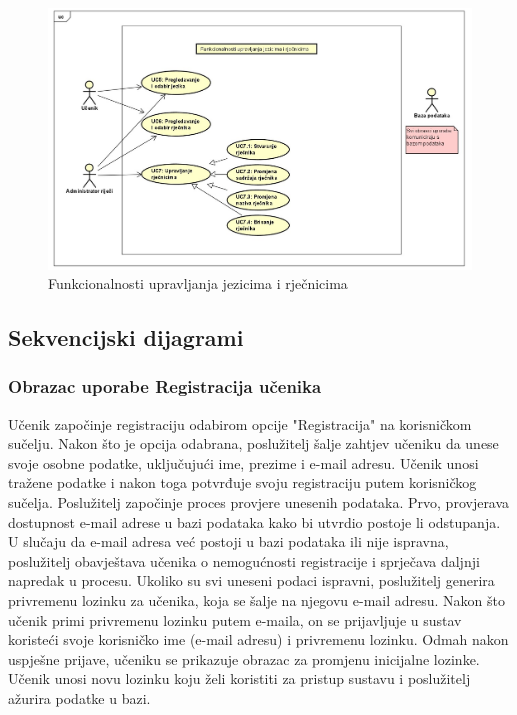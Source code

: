\begin{figure}[H]
	\includegraphics[scale=0.34]{dijagrami/dijagram3.jpg} 
	\centering
	\caption{Funkcionalnosti upravljanja jezicima i rječnicima}
	\label{fig:dijagram3}
\end{figure}	

\subsection{Sekvencijski dijagrami}

\subsubsection{{Obrazac uporabe Registracija učenika}}


Učenik započinje registraciju odabirom opcije "Registracija" na korisničkom sučelju. Nakon što je opcija odabrana, poslužitelj šalje zahtjev učeniku da unese svoje osobne podatke, uključujući ime, prezime i e-mail adresu. Učenik unosi tražene podatke i nakon toga potvrđuje svoju registraciju putem korisničkog sučelja. Poslužitelj započinje proces provjere unesenih podataka. Prvo, provjerava dostupnost e-mail adrese u bazi podataka kako bi utvrdio postoje li odstupanja. U slučaju da e-mail adresa već postoji u bazi podataka ili nije ispravna, poslužitelj obavještava učenika o nemogućnosti registracije i sprječava daljnji napredak u procesu. Ukoliko su svi uneseni podaci ispravni, poslužitelj generira privremenu lozinku za učenika, koja se šalje na njegovu e-mail adresu. Nakon što učenik primi privremenu lozinku putem e-maila, on se prijavljuje u sustav koristeći svoje korisničko ime (e-mail adresu) i privremenu lozinku. Odmah nakon uspješne prijave, učeniku se prikazuje obrazac za promjenu inicijalne lozinke. Učenik unosi novu lozinku koju želi koristiti za pristup sustavu i poslužitelj ažurira podatke u bazi.

